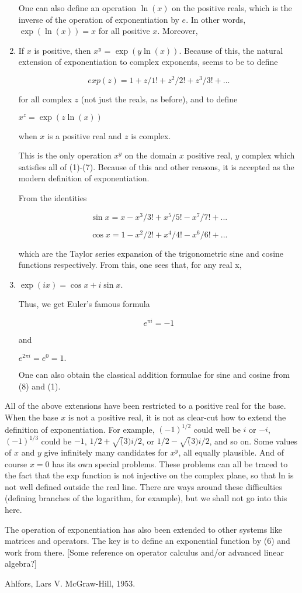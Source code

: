 \begin{enumerate}
One can also define an operation $\ln(x)$ on the positive reals, which is the
inverse of the operation of exponentiation by $e$.  In other words, $\exp(\ln(x))
= x$ for all positive $x$.  Moreover,

\item If $x$ is positive, then $x^y$ = $\exp(y \ln(x))$.
Because of this, the natural extension of exponentiation to complex
exponents, seems to be to define

\[ exp(z) = 1 + z/1! + z^2/2! + z^3/3! + ...\]

for all complex $z$ (not just the reals, as before), and to define

$x^z = \exp(z \ln(x))$

when $x$ is a positive real and $z$ is complex.

This is the only operation $x^y$ on the domain {$x$ positive real, $y$ complex}
which satisfies all of (1)-(7).  Because of this and other reasons, it
is accepted as the modern definition of exponentiation.

From the identities

\[ \sin x = x - x^3/3! + x^5/5! - x^7/7! + ...\]

\[ \cos x = 1 - x^2/2! + x^4/4! - x^6/6! + ... \]

which are the Taylor series expansion of the
trigonometric sine and cosine functions respectively.
From this, one sees that, for any real x,

\item $ \exp(ix) = \cos x + i \sin x.$

Thus, we get Euler's famous formula

\[e^{\pi i} = -1\]

and

$e^{2\pi i} = e^0 = 1.$

One can also obtain the classical addition formulae for sine and cosine
from (8) and (1).
\end{enumerate}

All of the above extensions have been restricted to a positive real for
the base.  When the base $x$ is not a positive real, it is not as
clear-cut how to extend the definition of exponentiation.  For example,
$(-1)^{1/2}$ could well be $i$ or $-i$, $(-1)^{1/3}$ could be $-1$, $1/2 +
\sqrt(3)i/2$, or $1/2 - \sqrt(3)i/2$, and so on.  Some values of $x$ and $y$
 give
infinitely many candidates for $x^y$, all equally plausible.  And of
course $x=0$ has its own special problems.  These problems can all be
traced to the fact that the exp function is not injective on the complex
plane, so that ln is not well defined outside the real line.  There are
ways around these difficulties (defining branches of the logarithm, for
example), but we shall not go into this here.

The operation of exponentiation has also been extended to other systems
like matrices and operators.  The key is to define an exponential
function by (6) and work from there.  [Some reference on operator
calculus and/or advanced linear algebra?]

\Ref

     {Ahlfors, Lars V.}
     {McGraw-Hill, 1953.}

